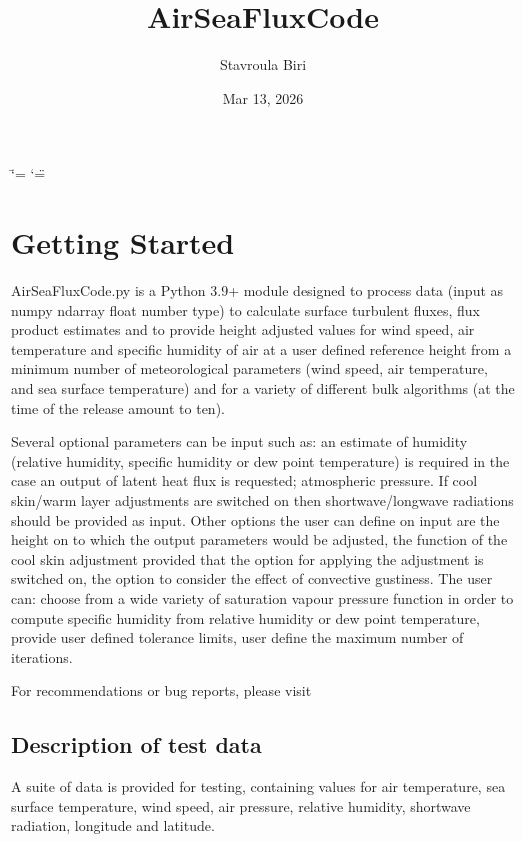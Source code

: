 \documentclass[letterpaper,10pt,english]{sphinxmanual}
\title{AirSeaFluxCode}
\date{Mar 13, 2026}
\author{Stavroula Biri}
\begin{document}
\ifdefined\shorthandoff
  \ifnum\catcode`\=\string=\active\shorthandoff{=}\fi
  \ifnum\catcode`\"=\active{}\fi
\fi

\pagestyle{empty}
\sphinxmaketitle
\pagestyle{plain}
\sphinxtableofcontents
\pagestyle{normal}
\label{\detokenize{index::doc}}


\sphinxstepscope


\chapter{Getting Started}
\label{\detokenize{getting_started:getting-started}}\label{\detokenize{getting_started::doc}}
\sphinxAtStartPar
AirSeaFluxCode.py is a Python 3.9+ module designed to process data (input as numpy ndarray float number type) to calculate surface turbulent fluxes, flux product estimates and to provide height adjusted values for wind speed, air temperature and specific humidity of air at a user defined reference height from a minimum number of meteorological parameters (wind speed, air temperature, and sea surface temperature) and for a variety of different bulk algorithms (at the time of the release amount to ten).

\sphinxAtStartPar
Several optional parameters can be input such as: an estimate of humidity (relative humidity, specific humidity or dew point temperature) is required in the case an output of latent heat flux is requested; atmospheric pressure. If cool skin/warm layer adjustments are switched on then shortwave/longwave radiations should be provided as input. Other options the user can define on input are the height on to which the output parameters would be adjusted, the function of the cool skin adjustment provided that the option for applying the adjustment is switched on, the option to consider the effect of convective gustiness. The user can: choose from a wide variety of saturation vapour pressure function in order to compute specific humidity from relative humidity or dew point temperature, provide user defined tolerance limits, user define the maximum number of iterations.

\sphinxAtStartPar
For recommendations or bug reports, please visit 


\section{Description of test data}
\label{\detokenize{getting_started:description-of-test-data}}
\sphinxAtStartPar
A suite of data is provided for testing, containing values for air temperature, sea surface temperature, wind speed, air pressure, relative humidity, shortwave radiation, longitude and latitude.
\end{document}
